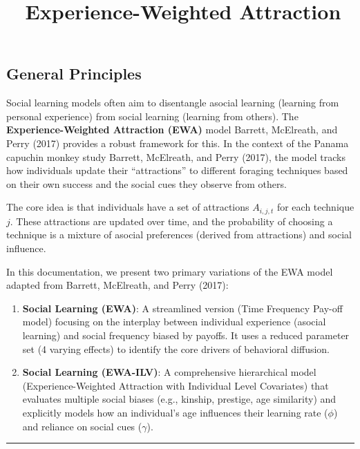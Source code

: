 \documentclass[
  letterpaper,
  DIV=11,
  numbers=noendperiod]{scrartcl}
\title{🚧Experience-Weighted Attraction}
\author{}
\date{}
\begin{document}
\maketitle


\subsection{General Principles}\label{general-principles}

Social learning models often aim to disentangle asocial learning
(learning from personal experience) from social learning (learning from
others). The \textbf{Experience-Weighted Attraction (EWA)} model
Barrett, McElreath, and Perry (2017) provides a robust framework for
this. In the context of the Panama capuchin monkey study Barrett,
McElreath, and Perry (2017), the model tracks how individuals update
their ``attractions'' to different foraging techniques based on their
own success and the social cues they observe from others.

The core idea is that individuals have a set of attractions
\(A_{i,j,t}\) for each technique \(j\). These attractions are updated
over time, and the probability of choosing a technique is a mixture of
asocial preferences (derived from attractions) and social influence.

In this documentation, we present two primary variations of the EWA
model adapted from Barrett, McElreath, and Perry (2017):

\begin{enumerate}
\def\labelenumi{\arabic{enumi}.}
\item
  \textbf{Social Learning (EWA)}: A streamlined version (Time Frequency
  Pay-off model) focusing on the interplay between individual experience
  (asocial learning) and social frequency biased by payoffs. It uses a
  reduced parameter set (4 varying effects) to identify the core drivers
  of behavioral diffusion.
\item
  \textbf{Social Learning (EWA-ILV)}: A comprehensive hierarchical model
  (Experience-Weighted Attraction with Individual Level Covariates) that
  evaluates multiple social biases (e.g., kinship, prestige, age
  similarity) and explicitly models how an individual's age influences
  their learning rate (\(\phi\)) and reliance on social cues
  (\(\gamma\)).
\end{enumerate}

\begin{center}\rule{0.5\linewidth}{0.5pt}\end{center}
\end{document}
